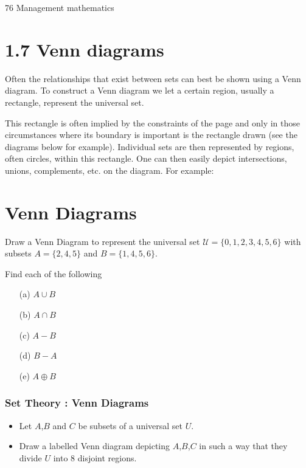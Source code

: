 
76 Management mathematics

\section{1.7 Venn diagrams}
Often the relationships that exist between sets can best be shown using a
Venn diagram. To construct a Venn diagram we let a certain region, usually
a rectangle, represent the universal set. 

This rectangle is often implied
by the constraints of the page and only in those circumstances where its
boundary is important is the rectangle drawn (see the diagrams below for
example). Individual sets are then represented by regions, often circles,
within this rectangle. One can then easily depict intersections, unions,
complements, etc. on the diagram. For example:

\newpage
\section*{Venn Diagrams}
Draw a Venn Diagram to represent the universal set
$\mathcal{U} = \{0,1,2,3,4,5,6\}$ with subsets
$A = \{2,4,5\}$ and 
$B = \{1,4,5,6\}$.

\noindent Find each of the following
\begin{itemize}
\item[(a)] $A \cup B $
\item[(b)] $A \cap B $
\item[(c)] $A-B$
\item[(d)] $B-A$
\item[(e)] $A \oplus B$
\end{itemize}


\frametitle{Set Theory : Venn Diagrams}
\Large

\begin{itemize}
	\item Let $A$,$B$ and $C$ be subsets of a universal set $U$.
	\item Draw a labelled Venn diagram depicting $A$,$B$,$C$ in such a way that they divide $U$ into 8 disjoint regions.
\end{itemize}


